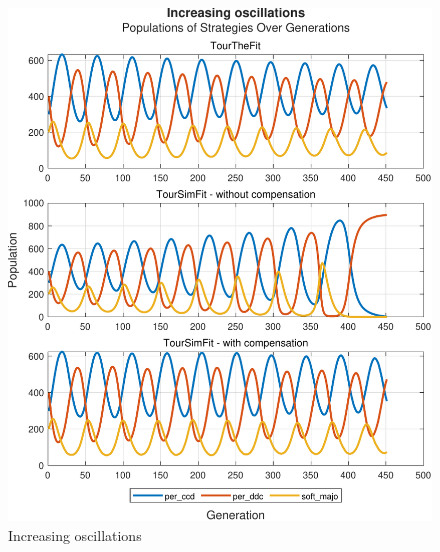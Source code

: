 \documentclass[12pt]{article}
\begin{document}
	\begin{figure}[h]
	      \centering
	      \includegraphics[scale=0.8]{Increasing oscillations.pdf}
	      \caption{Increasing oscillations}
	      \label{fig:Αύξουσες Ταλαντώσεις}
	\end{figure}
\end{document}
